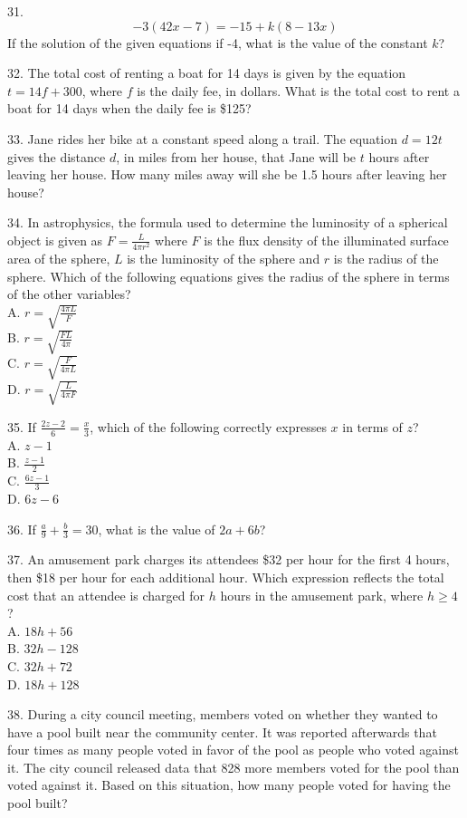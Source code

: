 \documentclass[../satmath.tex]{subfiles}
\begin{document}
31. 
\[-3(42x-7)=-15+k(8-13x)\]
If the solution of the given equations if -4, what is the value of the constant $k$?
\medbreak

32. The total cost of renting a boat for 14 days is given by the equation $t=14f+300$, where $f$ is the daily fee, in dollars. What is the total 
cost to rent a boat for 14 days when the daily fee is \$125? 
\medbreak

33. Jane rides her bike at a constant speed along a trail. The equation $d=12t$ gives the distance $d$, in miles from her house, that Jane will be 
$t$ hours after leaving her house. How many miles away will she be 1.5 hours after leaving her house?
\medbreak

34. In astrophysics, the formula used to determine the luminosity of a spherical object is given as $F=\frac{L}{4\pi r^2}$ where $F$ is the 
flux density of the illuminated surface area of the sphere, $L$ is the luminosity of the sphere and $r$ is the radius of the sphere. Which of the following 
equations gives the radius of the sphere in terms of the other variables?\\
A. $r=\sqrt{\frac{4\pi L}{F}}$\\
B. $r=\sqrt{\frac{FL}{4\pi}}$\\
C. $r=\sqrt{\frac{F}{4\pi L}}$\\
D. $r=\sqrt{\frac{L}{4\pi F}}$
\medbreak

35. If $\frac{2z-2}{6}=\frac{x}{3}$, which of the following correctly expresses $x$ in terms of $z$?\\
A. $z-1$\\
B. $\frac{z-1}{2}$\\
C. $\frac{6z-1}{3}$\\
D. $6z-6$
\medbreak

36. If $\frac{a}{9}+\frac{b}{3}=30$, what is the value of $2a+6b$?
\medbreak

37. An amusement park charges its attendees \$32 per hour for the first 4 hours, then \$18 per hour for each additional hour. Which expression reflects the 
total cost that an attendee is charged for $h$ hours in the amusement park, where $h\geq 4$?\\
A. $18h+56$\\
B. $32h-128$\\
C. $32h+72$\\
D. $18h+128$
\medbreak

38. During a city council meeting, members voted on whether they wanted to have a pool built near the community center. It was reported afterwards that 
four times as many people voted in favor of the pool as people who voted against it. The city council released data that 828 more members voted 
for the pool than voted against it. Based on this situation, how many people voted for having the pool built?
\medbreak
\end{document}

